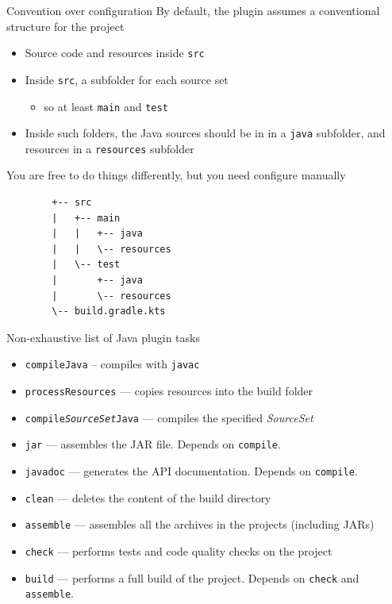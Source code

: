 \documentclass[presentation]{beamer}
\begin{document}
\begin{frame}[fragile]{Convention over configuration}
    By default, the plugin assumes a conventional structure for the project
    \begin{itemize}
        \item Source code and resources inside \texttt{src}
        \item Inside \texttt{src}, a subfolder for each source set
        \begin{itemize}
            \item so at least \texttt{main} and \texttt{test}
        \end{itemize}
        \item Inside such folders, the Java sources should be in in a \texttt{java} subfolder, and resources in a \texttt{resources} subfolder
    \end{itemize}
    You are free to do things differently, but you need configure manually
    \begin{verbatim}
        +-- src
        |   +-- main
        |   |   +-- java
        |   |   \-- resources
        |   \-- test
        |       +-- java
        |       \-- resources
        \-- build.gradle.kts
    \end{verbatim}
\end{frame}

\begin{frame}[fragile]{Non-exhaustive list of Java plugin tasks}
    \begin{itemize}
        \item \texttt{compileJava} -- compiles with \texttt{javac}
        \item \texttt{processResources} --- copies resources into the build folder
        \item \texttt{compile\textit{SourceSet}Java} --- compiles the specified \textit{SourceSet}
        \item \texttt{jar} --- assembles the JAR file. Depends on \texttt{compile}.
        \item \texttt{javadoc} --- generates the API documentation. Depends on \texttt{compile}.
        \item \texttt{clean} --- deletes the content of the build directory
        \item \texttt{assemble} --- assembles all the archives in the projects (including JARs)
        \item \texttt{check} --- performs tests and code quality checks on the project
        \item \texttt{build} --- performs a full build of the project. Depends on \texttt{check} and \texttt{assemble}.
    \end{itemize}
\end{frame}
\end{document}
